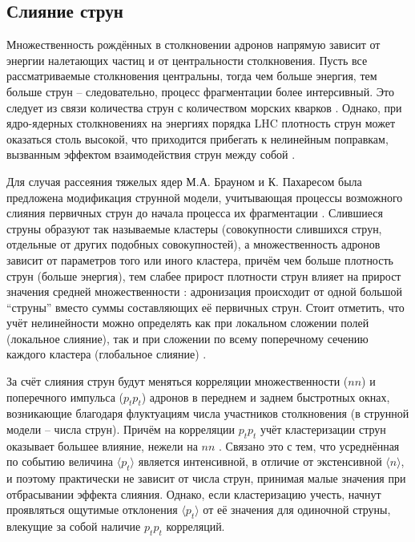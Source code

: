 \subsection{Слияние струн}
Множественность рождённых в столкновении адронов напрямую зависит от энергии налетающих частиц и от центральности столкновения. 
Пусть все рассматриваемые столкновения центральны, тогда чем больше энергия, тем больше струн -- следовательно, процесс фрагментации более интерсивный. Это следует из связи количества струн с количеством морских кварков \cite{SeaQarkStrings}. 
Однако, при ядро-ядерных столкновениях на энергиях порядка LHC плотность струн может оказаться столь высокой, что приходится прибегать к нелинейным поправкам, вызванным эффектом взаимодействия струн между собой \cite{StringFusion}.

Для случая рассеяния тяжелых ядер М.А. Брауном и К. Пахаресом была предложена модификация струнной модели, учитывающая процессы возможного слияния первичных струн до начала процесса их фрагментации \cite{PreFusion1, PreFusion2, PreFusion3, PreFusion4}. 
Слившиеся струны образуют так называемые кластеры (совокупности слившихся струн, отдельные от других подобных совокупностей), а множественность адронов зависит от параметров того или иного кластера, причём чем больше плотность струн (больше энергия), тем слабее прирост плотности струн влияет на прирост значения средней множественности \cite{MulReduction}: адронизация происходит от одной большой ``струны'' вместо суммы составляющих её первичных струн. 
Стоит отметить, что учёт нелинейности можно определять как при локальном сложении полей (локальное слияние), так и при сложении по всему поперечному сечению каждого кластера (глобальное слияние) \cite{MulReduction}.

За счёт слияния струн будут меняться корреляции множественности ($nn$) и поперечного импульса ($p_t p_t$) адронов в переднем и заднем быстротных окнах, возникающие благодаря флуктуациям числа участников столкновения (в струнной модели -- числа струн). 
Причём на корреляции $p_t p_t$ учёт кластеризации струн оказывает большее влияние, нежели на $nn$ \cite{MulReduction, PtPtCorr}. 
Связано это с тем, что усреднённая по событию величина $\langle p_t \rangle$ является интенсивной, в отличие от экстенсивной $\langle n \rangle$, и поэтому практически не зависит от числа струн, принимая малые значения при отбрасывании эффекта слияния. 
Однако, если кластеризацию учесть, начнут проявляться ощутимые отклонения $\langle p_t \rangle$ от её значения для одиночной струны, влекущие за собой наличие $p_t p_t$ корреляций.
